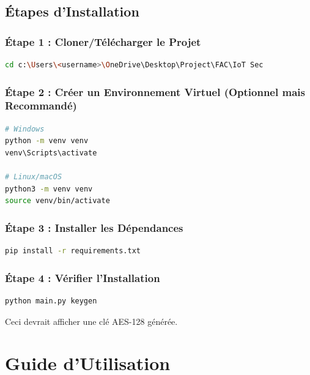 \documentclass[12pt,a4paper]{report}
\begin{document}
\section{Étapes d'Installation}

\subsection{Étape 1 : Cloner/Télécharger le Projet}

\begin{lstlisting}[language=bash]
cd c:\Users\<username>\OneDrive\Desktop\Project\FAC\IoT Sec
\end{lstlisting}

\subsection{Étape 2 : Créer un Environnement Virtuel (Optionnel mais Recommandé)}

\begin{lstlisting}[language=bash]
# Windows
python -m venv venv
venv\Scripts\activate

# Linux/macOS
python3 -m venv venv
source venv/bin/activate
\end{lstlisting}

\subsection{Étape 3 : Installer les Dépendances}

\begin{lstlisting}[language=bash]
pip install -r requirements.txt
\end{lstlisting}

\subsection{Étape 4 : Vérifier l'Installation}

\begin{lstlisting}[language=bash]
python main.py keygen
\end{lstlisting}

Ceci devrait afficher une clé AES-128 générée.

\chapter{Guide d'Utilisation}
\end{document}
